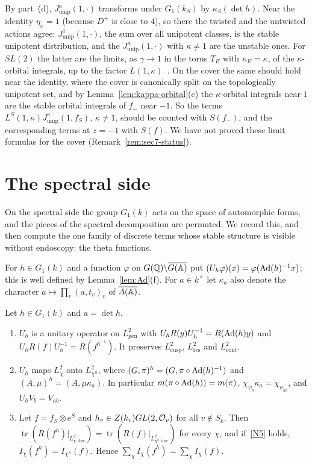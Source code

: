 By part~(d), $J^\kappa_{\mathrm{unip}}(1,\cdot)$ transforms under
$G_1(k_S)$ by $\kappa_S(\det h)$. Near the identity $\eta_x=1$ (because
$D^+$ is close to $4$), so there the twisted and the untwisted actions
agree: $J^1_{\mathrm{unip}}(1,\cdot)$, the sum over all unipotent classes,
is the stable unipotent distribution, and the
$J^\kappa_{\mathrm{unip}}(1,\cdot)$ with $\kappa\ne1$ are the unstable
ones. For $SL(2)$ the latter are the limits, as $\gamma\to1$ in the torus
$T_E$ with $\kappa_E=\kappa$, of the $\kappa$-orbital integrals, up to the
factor $L(1,\kappa)$~\cite[\S\S2,~5]{LL79}. On the cover the same should
hold near the identity, where the cover is canonically split on the
topologically unipotent set, and by Lemma~\ref{lem:kappa-orbital}(c) the
$\kappa$-orbital integrals near $1$ are the stable orbital integrals of
$f_-$ near $-1$. So the terms $L^S(1,\kappa)J^\kappa_{\mathrm{unip}}(1,
f_S)$, $\kappa\ne1$, should be counted with $S(f_-)$, and the
corresponding terms at $z=-1$ with $S(f)$. We have not proved these limit
formulas for the cover (Remark~\ref{rem:sec7-status}).

\section{The spectral side}\label{sec:spectral-gl2}

On the spectral side the group $G_1(k)$ acts on the space of automorphic
forms, and the pieces of the spectral decomposition are permuted. We
record this, and then compute the one family of discrete terms whose
stable structure is visible without endoscopy: the theta functions.

For $h\in G_1(k)$ and a function $\varphi$ on $G(\mathbb{Q})\backslash\overline{G(\mathbb{A})}$ put
$(U_h\varphi)(x)=\varphi(\operatorname{Ad}(h)^{-1}x)$; this is well defined by
Lemma~\ref{lem:Ad}(f). For $a\in k^\times$ let $\kappa_a$ also denote the
character $\tilde a\mapsto\prod_v(a,t_v)_v$ of $\overline{A(\mathbb{A})}$.

\begin{lemma}\label{lem:spectrum-gl2}
Let $h\in G_1(k)$ and $a=\det h$.
\begin{enumerate}[label=(\alph*)]
\item $U_h$ is a unitary operator on $L^2_{\mathrm{gen}}$ with
  $U_hR(y)U_h^{-1}=R(\operatorname{Ad}(h)y)$ and $U_hR(f)U_h^{-1}=R(f^{h^{-1}})$.
  It preserves $L^2_{\mathrm{cusp}}$, $L^2_{\mathrm{res}}$ and
  $L^2_{\mathrm{cont}}$.
\item $U_h$ maps $L^2_\chi$ onto $L^2_{\chi^h}$, where $(G,\pi)^h=
  (G,\pi\circ\operatorname{Ad}(h)^{-1})$ and $(A,\mu)^h=(A,\mu\kappa_a)$. In
  particular $m(\pi\circ\operatorname{Ad}(h))=m(\pi)$, $\chi_{\psi_b}\kappa_a=
  \chi_{\psi_{ab}}$, and $U_hV_b=V_{ab}$.
\item Let $f=f_S\otimes e^S$ and $h_v\in Z(k_v)GL(2,\mathcal{O}_v)$ for all
  $v\notin S_k$. Then $\operatorname{tr}(R(f^h)|_{L^2_{\chi,\mathrm{disc}}})=
  \operatorname{tr}(R(f)|_{L^2_{\chi^h,\mathrm{disc}}})$ for every $\chi$, and
  if~\ref{N5} holds, $I_\chi(f^h)=I_{\chi^h}(f)$. Hence
  $\sum_\chi I_\chi(f^h)=\sum_\chi I_\chi(f)$.
\end{enumerate}
\end{lemma}

